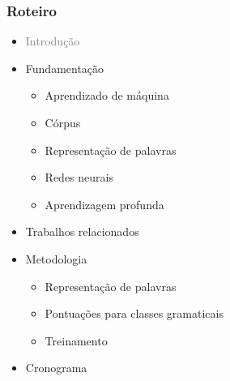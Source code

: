\documentclass[10pt]{beamer}
\begin{document}
\begin{frame}
  \frametitle{Roteiro}


  \begin{itemize}


    
    \item[\color{gray}{$\bullet$}] \textcolor{gray}{Introdução}
    
    \begin{itemize}
    \end{itemize}


    
    \item Fundamentação

    \begin{itemize}
      \item[\ ] Aprendizado de máquina
      \item[\ ] Córpus
      \item[\ ] Representação de palavras
      \item[\ ] Redes neurais
      \item[\ ] Aprendizagem profunda
    \end{itemize}


    \color{gray}
    \item[\color{gray}{$\bullet$}] Trabalhos relacionados

    \color{gray}
    \item[\color{gray}{$\bullet$}] Metodologia

    \begin{itemize}
      \color{gray}
      \item[\ ] Representação de palavras
      \item[\ ] Pontuações para classes gramaticais
      \item[\ ] Treinamento
    \end{itemize}

    \color{gray}
    \item[\color{gray}{$\bullet$}] Cronograma

  \end{itemize}

\end{frame}
\end{document}
